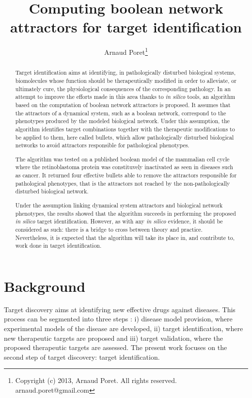 \documentclass[oneside,a4paper,onecolumn,notitlepage]{article}
\title{Computing boolean network attractors for target identification}
\author{Arnaud Poret\footnote{Copyright (c) 2013, Arnaud Poret. All rights reserved. arnaud.poret@gmail.com}}
\begin{document}
\maketitle
\tableofcontents

\begin{abstract}
Target identification aims at identifying, in pathologically disturbed biological systems, biomolecules whose function should be therapeutically modified in order to alleviate, or ultimately cure, the physiological consequences of the corresponding pathology. In an attempt to improve the efforts made in this area thanks to \textit{in silico} tools, an algorithm based on the computation of boolean network attractors is proposed. It assumes that the attractors of a dynamical system, such as a boolean network, correspond to the phenotypes produced by the modeled biological network. Under this assumption, the algorithm identifies target combinations together with the therapeutic modifications to be applied to them, here called bullets, which allow pathologically disturbed biological networks to avoid attractors responsible for pathological phenotypes.

The algorithm was tested on a published boolean model of the mammalian cell cycle where the retinoblastoma protein was constituvely inactivated as seen in diseases such as cancer. It returned four effective bullets able to remove the attractors responsible for pathological phenotypes, that is the attractors not reached by the non-pathologically disturbed biological network.

Under the assumption linking dynamical system attractors and biological network phenotypes, the results showed that the algorithm succeeds in performing the proposed \textit{in silico} target identification. However, as with any \textit{in silico} evidence, it should be considered as such: there is a bridge to cross between theory and practice. Nevertheless, it is expected that the algorithm will take its place in, and contribute to, work done in target identification.
\end{abstract}

\section*{Background}
Target discovery aims at identifying new effective drugs against diseases. This process can be segmented into three steps \cite{lindsay2003target}: i) disease model provision, where experimental models of the disease are developed, ii) target identification, where new therapeutic targets are proposed and iii) target validation, where the proposed therapeutic targets are assessed. The present work focuses on the second step of target discovery: target identification.
\end{document}

